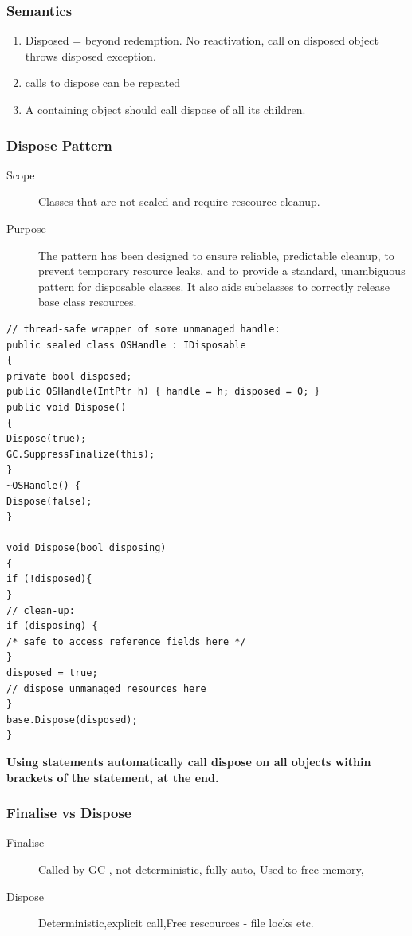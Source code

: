 \documentclass[a4paper,10pt]{scrartcl}
\begin{document}
\subsubsection{Semantics}
\begin{enumerate}
 \item Disposed = beyond redemption. No reactivation, call on disposed object throws disposed exception.
 \item calls to dispose can be repeated
 \item A containing object should call dispose of all its children.
\end{enumerate}

\subsubsection{Dispose Pattern}
\begin{description}
 \item [Scope] Classes that are not sealed and require rescource cleanup.
 \item [Purpose]  The pattern has been designed to ensure reliable, predictable
cleanup, to prevent temporary resource leaks, and to provide
a standard, unambiguous pattern for disposable classes. It
also aids subclasses to correctly release base class
resources.

\end{description}

\begin{lstlisting}[caption=Dispose Pattern Implementation]
 // thread-safe wrapper of some unmanaged handle:
public sealed class OSHandle : IDisposable
{
private bool disposed;
public OSHandle(IntPtr h) { handle = h; disposed = 0; }
public void Dispose()
{
Dispose(true);
GC.SuppressFinalize(this);
}
~OSHandle() {
Dispose(false);
}

void Dispose(bool disposing)
{
if (!disposed){
}
// clean-up:
if (disposing) {
/* safe to access reference fields here */
}
disposed = true;
// dispose unmanaged resources here
}
base.Dispose(disposed);
}
\end{lstlisting}

\textbf{Using statements automatically call dispose on all objects within brackets of the statement, at the end.}

\subsubsection{Finalise vs Dispose}
\begin{description}
 \item [Finalise] Called by GC , not deterministic, fully auto, Used to free memory,
 \item [Dispose] Deterministic,explicit call,Free rescources - file locks etc.
\end{description}
\end{document}
